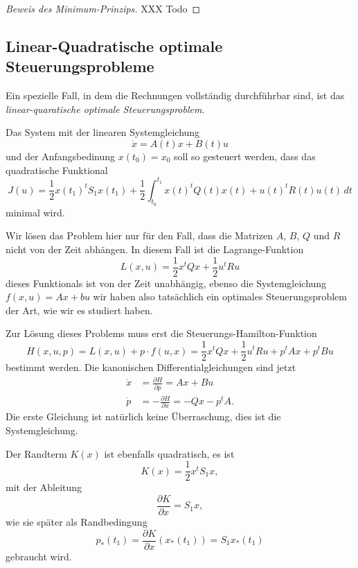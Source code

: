 \begin{proof}[Beweis des Minimum-Prinzips]

XXX Todo

\end{proof}

%
%
\subsection{Linear-Quadratische optimale Steuerungsprobleme
\label{buch:hamiltonjacobi:oc:subsection:quadratisch}}
Ein spezielle Fall, in dem die Rechnungen vollständig durchführbar sind,
ist das {\em linear-quaratische optimale Steuerungsproblem}.
%

\begin{aufgabe}
\label{buch:hamiltonjacobi:oc:aufgabe:lqc}
Das System mit der linearen Systemgleichung
\begin{equation}
\dot{x}
=
A(t)x
+
B(t)u
\end{equation}
und der Anfangsbedinung $x(t_0)=x_0$ soll so gesteuert werden,
dass das quadratische Funktional
\begin{equation}
J(u)
=
\frac12 x(t_1)^t S_1 x(t_1)
+
\frac12
\int_{t_0}^{t_1}
x(t)^t Q(t) x(t)
+
u(t)^t R(t) u(t)
\,dt
\end{equation}
minimal wird.
\end{aufgabe}
Wir lösen das Problem hier nur für den Fall, dass die Matrizen $A$, $B$,
$Q$ und $R$ nicht von der Zeit abhängen.
In diesem Fall ist die Lagrange-Funktion
\[
L(x,u)
=
\frac12 x^t Qx + \frac12 u^t Ru
\]
dieses Funktionals ist von der Zeit unabhängig,
ebenso die Systemgleichung $f(x,u)=Ax+bu$ wir haben also tatsächlich ein
optimales Steuerungsproblem der Art, wie wir es studiert haben.

Zur Lösung dieses Problems muss erst die Steuerungs-Hamilton-Funktion
\[
H(x,u,p)
=
L(x,u) + p\cdot f(u,x)
=
\frac12 x^tQx + \frac12 u^tRu + p^tAx + p^tBu
\]
bestimmt werden.
Die kanonischen Differentialgleichungen sind jetzt
\begin{align*}
\dot{x}
&=
\frac{\partial H}{\partial p}
=
Ax
+
Bu
\\
\dot{p}
&=
-\frac{\partial H}{\partial x}
=
-Qx - p^tA.
\end{align*}
Die erste Gleichung ist natürlich keine Überraschung, dies ist die
Systemgleichung.

Der Randterm $K(x)$ ist ebenfalls quadratisch, es ist
\[
K(x) = \frac12 x^t S_1 x,
\]
mit der Ableitung
\begin{equation*}
\frac{\partial K}{\partial x}
=
S_1x,
\end{equation*}
wie sie später als Randbedingung
\[
p_*(t_1)
=
\frac{\partial K}{\partial x}(x_*(t_1))
=
S_1x_*(t_1)
\]
gebraucht wird.

